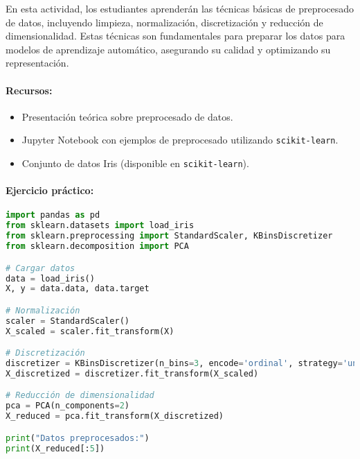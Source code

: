 \documentclass[a4,11pt]{aleph-notas}
\begin{document}
En esta actividad, los estudiantes aprenderán las técnicas básicas de preprocesado de datos, incluyendo limpieza, normalización, discretización y reducción de dimensionalidad. Estas técnicas son fundamentales para preparar los datos para modelos de aprendizaje automático, asegurando su calidad y optimizando su representación.


\paragraph{Recursos:} 
\begin{itemize}
    \item Presentación teórica sobre preprocesado de datos.
    \item Jupyter Notebook con ejemplos de preprocesado utilizando \texttt{scikit-learn}.
    \item Conjunto de datos Iris (disponible en \texttt{scikit-learn}).
\end{itemize}

\paragraph{Ejercicio práctico:} \hspace{0pt}

\begin{pycodigo}
\begin{lstlisting}[language=Python]
import pandas as pd
from sklearn.datasets import load_iris
from sklearn.preprocessing import StandardScaler, KBinsDiscretizer
from sklearn.decomposition import PCA

# Cargar datos
data = load_iris()
X, y = data.data, data.target

# Normalización
scaler = StandardScaler()
X_scaled = scaler.fit_transform(X)

# Discretización
discretizer = KBinsDiscretizer(n_bins=3, encode='ordinal', strategy='uniform')
X_discretized = discretizer.fit_transform(X_scaled)

# Reducción de dimensionalidad
pca = PCA(n_components=2)
X_reduced = pca.fit_transform(X_discretized)

print("Datos preprocesados:")
print(X_reduced[:5])
\end{lstlisting}
\end{pycodigo}
\end{document}
